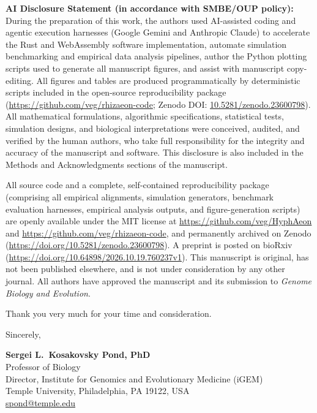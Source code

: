 \documentclass[11pt,letterpaper]{article}
\begin{document}
\textbf{AI Disclosure Statement (in accordance with SMBE/OUP policy):}
During the preparation of this work, the authors used AI-assisted coding and agentic execution harnesses (Google Gemini and Anthropic Claude) to accelerate the Rust and WebAssembly software implementation, automate simulation benchmarking and empirical data analysis pipelines, author the Python plotting scripts used to generate all manuscript figures, and assist with manuscript copy-editing. All figures and tables are produced programmatically by deterministic scripts included in the open-source reproducibility package (\url{https://github.com/veg/rhizaeon-code}; Zenodo DOI: \href{https://doi.org/10.5281/zenodo.23600798}{10.5281/zenodo.23600798}). All mathematical formulations, algorithmic specifications, statistical tests, simulation designs, and biological interpretations were conceived, audited, and verified by the human authors, who take full responsibility for the integrity and accuracy of the manuscript and software. This disclosure is also included in the Methods and Acknowledgments sections of the manuscript.

All source code and a complete, self-contained reproducibility package (comprising all empirical alignments, simulation generators, benchmark evaluation harnesses, empirical analysis outputs, and figure-generation scripts) are openly available under the MIT license at \url{https://github.com/veg/HyphAeon} and \url{https://github.com/veg/rhizaeon-code}, and permanently archived on Zenodo (\url{https://doi.org/10.5281/zenodo.23600798}). A preprint is posted on bioRxiv (\url{https://doi.org/10.64898/2026.10.19.760237v1}). This manuscript is original, has not been published elsewhere, and is not under consideration by any other journal. All authors have approved the manuscript and its submission to \textit{Genome Biology and Evolution}.

Thank you very much for your time and consideration.

Sincerely,

\textbf{Sergei L.\ Kosakovsky Pond, PhD}\\
Professor of Biology\\
Director, Institute for Genomics and Evolutionary Medicine (iGEM)\\
Temple University, Philadelphia, PA 19122, USA\\
\href{mailto:spond@temple.edu}{spond@temple.edu}
\end{document}
